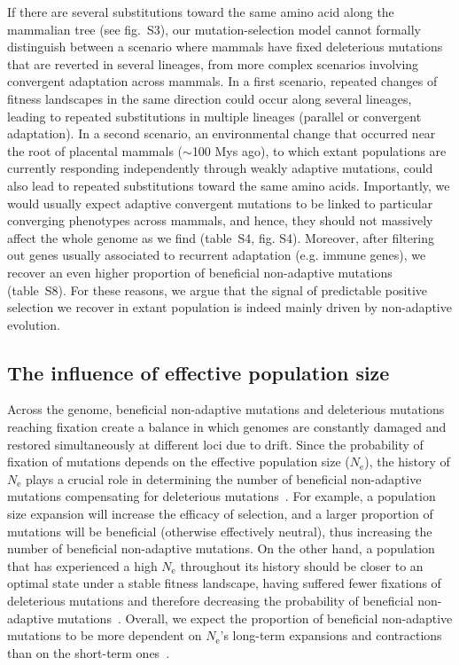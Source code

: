 \documentclass{article}
\newcommand{\Ne}{N_{\text{e}}}
\begin{document}
    If there are several substitutions toward the same amino acid along the mammalian tree (see fig.~S3), our mutation-selection model cannot formally distinguish between a scenario where mammals have fixed deleterious mutations that are reverted in several lineages, from more complex scenarios involving convergent adaptation across mammals.
    In a first scenario, repeated changes of fitness landscapes in the same direction could occur along several lineages, leading to repeated substitutions in multiple lineages (parallel or convergent adaptation).
    In a second scenario, an environmental change that occurred near the root of placental mammals ($\sim$100 Mys ago), to which extant populations are currently responding independently through weakly adaptive mutations, could also lead to repeated substitutions toward the same amino acids.
    Importantly, we would usually expect adaptive convergent mutations to be linked to particular converging phenotypes across mammals, and hence, they should not massively affect the whole genome as we find (table~S4, fig. S4).
    Moreover, after filtering out genes usually associated to recurrent adaptation (e.g. immune genes), we recover an even higher proportion of beneficial non-adaptive mutations (table~S8).
    For these reasons, we argue that the signal of predictable positive selection we recover in extant population is indeed mainly driven by non-adaptive evolution.

    \subsection*{The influence of effective population size}

    Across the genome, beneficial non-adaptive mutations and deleterious mutations reaching fixation create a balance in which genomes are constantly damaged and restored simultaneously at different loci due to drift.
    Since the probability of fixation of mutations depends on the effective population size ($\Ne$), the history of $\Ne$ plays a crucial role in determining the number of beneficial non-adaptive mutations compensating for deleterious mutations~\cite{latrille_inferring_2021}.
    For example, a population size expansion will increase the efficacy of selection, and a larger proportion of mutations will be beneficial (otherwise effectively neutral), thus increasing the number of beneficial non-adaptive mutations.
    On the other hand, a population that has experienced a high $\Ne$ throughout its history should be closer to an optimal state under a stable fitness landscape, having suffered fewer fixations of deleterious mutations and therefore decreasing the probability of beneficial non-adaptive mutations~\cite{huber_determining_2017}.
    Overall, we expect the proportion of beneficial non-adaptive mutations to be more dependent on $\Ne$’s long-term expansions and contractions than on the short-term ones~\cite{charlesworth_other_2007,huber_determining_2017}.
\end{document}
